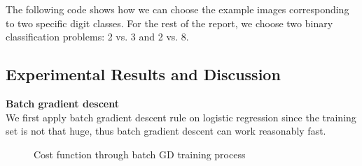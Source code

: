 \documentclass{article} %
\begin{document}
The following code shows how we can choose the example images corresponding to two specific digit classes. For the rest of the report, we choose two binary classification problems: 2 vs. 3 and 2 vs. 8.

\subsection{Experimental Results and Discussion}
\textbf{Batch gradient descent}\\
We first apply batch gradient descent rule on logistic regression since the training set is not that huge, thus batch gradient descent can work reasonably fast. 

\begin{figure}%
	\centering
	\qquad
	\caption{Cost function through batch GD training process}%
	\label{fig:P1}%
\end{figure}
\end{document}
